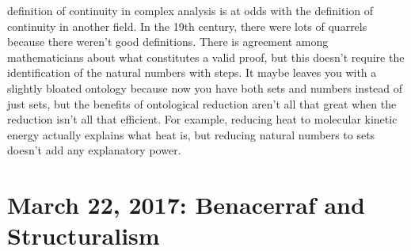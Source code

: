 \documentclass[12pt]{article}
\theoremstyle{definition}
\begin{document}
\begin{enumerate}
        definition of continuity in complex analysis is at odds with the
        definition of continuity in another field. In the 19th century, there
        were lots of quarrels because there weren't good definitions. There is
        agreement among mathematicians about what constitutes a valid proof,
        but this doesn't require the identification of the natural numbers with
        steps. It maybe leaves you with a slightly bloated ontology because now
        you have both sets and numbers instead of just sets, but the benefits
        of ontological reduction aren't all that great when the reduction isn't
        all that efficient. For example, reducing heat to molecular kinetic
        energy actually explains what heat is, but reducing natural numbers to
        sets doesn't add any explanatory power. 

\end{enumerate}

\section{March 22, 2017: Benacerraf and Structuralism}
\end{document}
